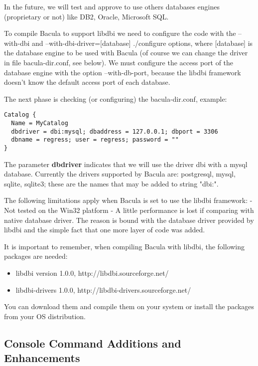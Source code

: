  In the future, we will test and approve to use others databases engines
 (proprietary or not) like DB2, Oracle, Microsoft SQL.

 To compile Bacula to support libdbi we need to configure the code with the
 --with-dbi and --with-dbi-driver=[database] ./configure options, where
 [database] is the database engine to be used with Bacula (of course we can
 change the driver in file bacula-dir.conf, see below).  We must configure the
 access port of the database engine with the option --with-db-port, because the
 libdbi framework doesn't know the default access port of each database.

The next phase is checking (or configuring) the bacula-dir.conf, example:
\begin{verbatim}
Catalog {
  Name = MyCatalog
  dbdriver = dbi:mysql; dbaddress = 127.0.0.1; dbport = 3306
  dbname = regress; user = regress; password = ""
}
\end{verbatim}

The parameter {\bf dbdriver} indicates that we will use the driver dbi with a
mysql database.  Currently the drivers supported by Bacula are: postgresql,
mysql, sqlite, sqlite3; these are the names that may be added to string "dbi:".

The following limitations apply when Bacula is set to use the libdbi framework:
 - Not tested on the Win32 platform
 - A little performance is lost if comparing with native database driver. 
   The reason is bound with the database driver provided by libdbi and the 
   simple fact that one more layer of code was added.

It is important to remember, when compiling Bacula with libdbi, the
following packages are needed:
 \begin{itemize}
  \item libdbi version 1.0.0, http://libdbi.sourceforge.net/
  \item libdbi-drivers 1.0.0, http://libdbi-drivers.sourceforge.net/
 \end{itemize}
 
 You can download them and compile them on your system or install the packages
 from your OS distribution.

\subsection{Console Command Additions and Enhancements}

